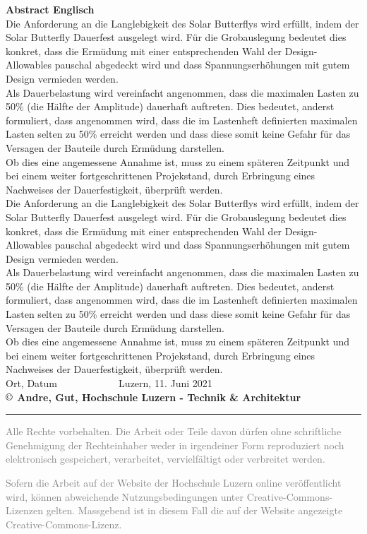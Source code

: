 \textbf{Abstract Englisch}\\
Die Anforderung an die Langlebigkeit des Solar Butterflys wird erfüllt, indem der Solar Butterfly Dauerfest ausgelegt wird. Für die Grobauslegung bedeutet dies konkret, dass die Ermüdung mit einer entsprechenden Wahl der Design-Allowables pauschal abgedeckt wird und dass Spannungserhöhungen mit gutem Design vermieden werden.\\
Als Dauerbelastung wird vereinfacht angenommen, dass die maximalen Lasten zu 50\% (die Hälfte der Amplitude) dauerhaft auftreten. Dies bedeutet, anderst formuliert, dass angenommen wird, dass die im Lastenheft definierten maximalen Lasten selten zu 50\% erreicht werden und dass diese somit keine Gefahr für das Versagen der Bauteile durch Ermüdung darstellen.\\
Ob dies eine angemessene Annahme ist, muss zu einem späteren Zeitpunkt und bei einem weiter fortgeschrittenen Projekstand, durch Erbringung eines Nachweises der Dauerfestigkeit, überprüft werden.\\
Die Anforderung an die Langlebigkeit des Solar Butterflys wird erfüllt, indem der Solar Butterfly Dauerfest ausgelegt wird. Für die Grobauslegung bedeutet dies konkret, dass die Ermüdung mit einer entsprechenden Wahl der Design-Allowables pauschal abgedeckt wird und dass Spannungserhöhungen mit gutem Design vermieden werden.\\
Als Dauerbelastung wird vereinfacht angenommen, dass die maximalen Lasten zu 50\% (die Hälfte der Amplitude) dauerhaft auftreten. Dies bedeutet, anderst formuliert, dass angenommen wird, dass die im Lastenheft definierten maximalen Lasten selten zu 50\% erreicht werden und dass diese somit keine Gefahr für das Versagen der Bauteile durch Ermüdung darstellen.\\
Ob dies eine angemessene Annahme ist, muss zu einem späteren Zeitpunkt und bei einem weiter fortgeschrittenen Projekstand, durch Erbringung eines Nachweises der Dauerfestigkeit, überprüft werden.\\

\vspace{2cm}
Ort, Datum $\;\;\;\;\;\;\;\;\;\;\;\;\;\;\;\;\;\;\;\;$ Luzern, 11. Juni 2021\\
\textbf{{\small $\copyright$} Andre, Gut, Hochschule Luzern - Technik \& Architektur}

\vspace*{\fill}

\noindent
{\color{gray} \rule{\linewidth}{0.5px} }
\begin{footnotesize}
  \textcolor{gray}{Alle Rechte vorbehalten. Die Arbeit oder Teile davon dürfen ohne schriftliche Genehmigung der Rechteinhaber weder in irgendeiner Form reproduziert noch elektronisch gespeichert, verarbeitet, vervielfältigt oder verbreitet werden.}

  \textcolor{gray}{Sofern die Arbeit auf der Website der Hochschule Luzern online veröffentlicht wird, können abweichende Nutzungsbedingungen unter Creative-Commons-Lizenzen gelten. Massgebend ist in diesem Fall die auf der Website angezeigte Creative-Commons-Lizenz.}
\end{footnotesize}
\newpage
